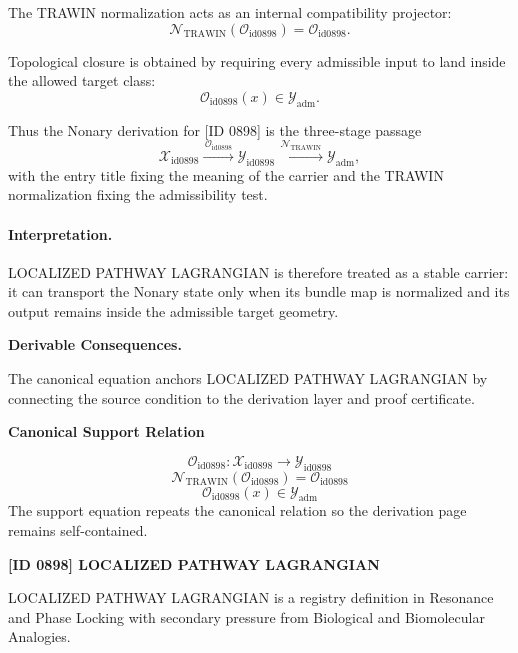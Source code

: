 The TRAWIN normalization acts as an internal compatibility projector:\[
\mathcal{N}_{\mathrm{TRAWIN}}(\mathcal{O}_{\mathrm{id0898}})=\mathcal{O}_{\mathrm{id0898}}.
\]

Topological closure is obtained by requiring every admissible input to land inside the allowed target class:\[
\mathcal{O}_{\mathrm{id0898}}(x)\in\mathcal{Y}_{\mathrm{adm}}.
\]

Thus the Nonary derivation for [ID 0898] is the three-stage passage
\[
\mathcal{X}_{\mathrm{id0898}}\xrightarrow{\,\mathcal{O}_{\mathrm{id0898}}\,} \mathcal{Y}_{\mathrm{id0898}}\xrightarrow{\,\mathcal{N}_{\mathrm{TRAWIN}}\,} \mathcal{Y}_{\mathrm{adm}},
\]
with the entry title fixing the meaning of the carrier and the TRAWIN normalization fixing the admissibility test.

\paragraph{Interpretation.} LOCALIZED PATHWAY LAGRANGIAN is therefore treated as a stable carrier: it can transport the Nonary state only when its bundle map is normalized and its output remains inside the admissible target geometry.

\par\vspace{0.35em}
\noindent\textbf{Derivable Consequences.}\quad
\begingroup
\footnotesize
\raggedright
The canonical equation anchors LOCALIZED PATHWAY LAGRANGIAN by connecting the source condition to the derivation layer and proof certificate.
\par\endgroup

\noindent\textbf{Canonical Support Relation}\par
\[
\mathcal{O}_{\mathrm{id0898}}:\mathcal{X}_{\mathrm{id0898}}\longrightarrow\mathcal{Y}_{\mathrm{id0898}}
\]
\[
\mathcal{N}_{\mathrm{TRAWIN}}(\mathcal{O}_{\mathrm{id0898}})=\mathcal{O}_{\mathrm{id0898}}
\]
\[
\mathcal{O}_{\mathrm{id0898}}(x)\in\mathcal{Y}_{\mathrm{adm}}
\]
\noindent The support equation repeats the canonical relation so the derivation page remains self-contained.\par

\clearpage
\noindent\textbf{[ID 0898] LOCALIZED PATHWAY LAGRANGIAN}\par
\vspace{0.35em}
\begingroup\small
{}
LOCALIZED PATHWAY LAGRANGIAN is a registry definition in Resonance and Phase Locking with secondary pressure from Biological and Biomolecular Analogies.

